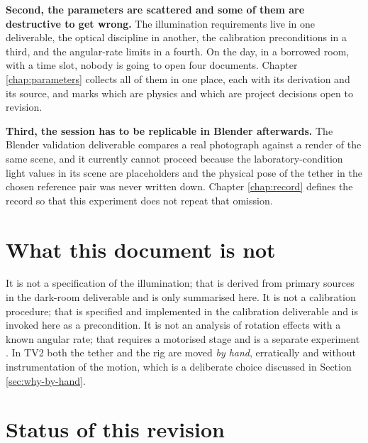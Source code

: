 \textbf{Second, the parameters are scattered and some of them are
destructive to get wrong.} The illumination requirements live in one
deliverable, the optical discipline in another, the calibration preconditions
in a third, and the angular-rate limits in a fourth. On the day, in a borrowed
room, with a time slot, nobody is going to open four documents. Chapter
\ref{chap:parameters} collects all of them in one place, each with its
derivation and its source, and marks which are physics and which are project
decisions open to revision.

\textbf{Third, the session has to be replicable in Blender afterwards.} The
Blender validation deliverable \cite{linku_blender_validation} compares a real
photograph against a render of the same scene, and it currently cannot proceed
because the laboratory-condition light values in its scene are placeholders and
the physical pose of the tether in the chosen reference pair was never written
down. Chapter \ref{chap:record} defines the record so that this experiment does
not repeat that omission.

\section*{What this document is not}

It is not a specification of the illumination; that is derived from primary
sources in the dark-room deliverable \cite{linku_darkroom_illumination} and is
only summarised here. It is not a calibration procedure; that is specified and
implemented in the calibration deliverable \cite{linku_calibration_method} and
is invoked here as a precondition. It is not an analysis of rotation effects
with a known angular rate; that requires a motorised stage and is a separate
experiment \cite{linku_rollingshutter}. In TV2 both the tether and the rig are
moved \emph{by hand}, erratically and without instrumentation of the motion,
which is a deliberate choice discussed in Section \ref{sec:why-by-hand}.

\section*{Status of this revision}

